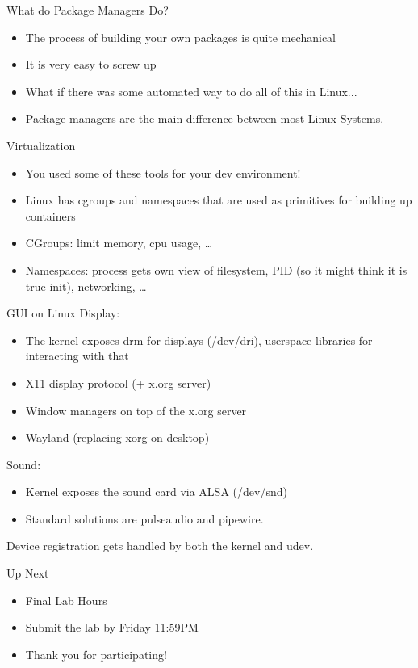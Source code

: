 \documentclass{../lecture}
\begin{document}
\begin{frame}{What do Package Managers Do?}
  \begin{itemize}
    \item The process of building your own packages is quite mechanical
    \item It is very easy to screw up
    \item What if there was some automated way to do all of this in Linux...
    \item Package managers are the main difference between most Linux Systems.
  \end{itemize}
\end{frame}

\begin{frame}{Virtualization}
  \begin{itemize}
    \item You used some of these tools for your dev environment!
    \item Linux has cgroups and namespaces that are used as primitives for
      building up containers
    \item CGroups: limit memory, cpu usage, \dots
    \item Namespaces: process gets own view of filesystem, PID (so it might
      think it is true init), networking, \dots
  \end{itemize}
\end{frame}

\begin{frame}{GUI on Linux}
  Display:
  \begin{itemize}
    \item The kernel exposes drm for displays (/dev/dri), userspace libraries
      for interacting with that
    \item X11 display protocol (+ x.org server)
    \item Window managers on top of the x.org server
    \item Wayland (replacing xorg on desktop)
  \end{itemize}
  Sound:
  \begin{itemize}
    \item Kernel exposes the sound card via ALSA (/dev/snd)
    \item Standard solutions are pulseaudio and pipewire.
  \end{itemize}
  Device registration gets handled by both the kernel and udev.
\end{frame}

\begin{frame}{Up Next}
  \begin{itemize}
    \item Final Lab Hours
    \item Submit the lab by Friday 11:59PM
    \item Thank you for participating!
  \end{itemize}
\end{frame}
\end{document}
